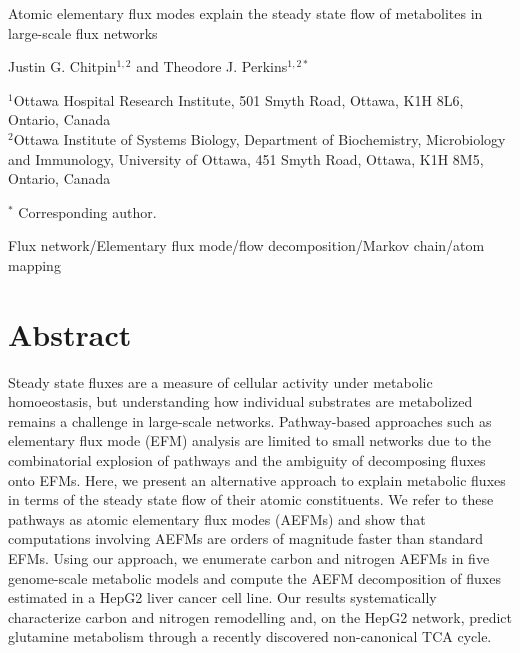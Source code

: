 \documentclass[12pt]{article}
\begin{document}
\begin{titlepage}
    \begin{center}
        \vspace*{1cm}

        {\Large Atomic elementary flux modes explain the steady state flow of
        metabolites in large-scale flux networks}

            
        \vspace{1.0cm}

        Justin G. Chitpin$^{1,2}$ and Theodore J. Perkins$^{1,2*}$

        \vspace{1.0cm}

        $^1$Ottawa Hospital Research Institute, 501 Smyth Road, Ottawa, K1H 8L6, Ontario, Canada\\
        $^2$Ottawa Institute of Systems Biology, Department of Biochemistry, Microbiology and Immunology, University of Ottawa, 451 Smyth Road, Ottawa, K1H 8M5, Ontario, Canada
           
        \vspace{0.5cm}

        $^*$ Corresponding author.

        \vspace{1.0cm}
     
        Flux network/Elementary flux mode/flow decomposition/Markov chain/atom mapping
            
   \end{center}
\end{titlepage}

\clearpage

\section*{Abstract} %

Steady state fluxes are a measure of cellular activity under metabolic homoeostasis, but understanding how individual substrates are metabolized remains a challenge in large-scale networks. Pathway-based approaches such as elementary flux mode (EFM) analysis are limited to small networks due to the combinatorial explosion of pathways and the ambiguity of decomposing fluxes onto EFMs. Here, we present an alternative approach to explain metabolic fluxes in terms of the steady state flow of their atomic constituents. We refer to these pathways as atomic elementary flux modes (AEFMs) and show that computations involving AEFMs are orders of magnitude faster than standard EFMs. Using our approach, we enumerate carbon and nitrogen AEFMs in five genome-scale metabolic models and compute the AEFM decomposition of fluxes estimated in a HepG2 liver cancer cell line. Our results systematically characterize carbon and nitrogen remodelling and, on the HepG2 network, predict glutamine metabolism through a recently discovered non-canonical TCA cycle. 
\end{document}
